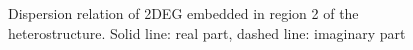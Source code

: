 \documentclass[11pt]{article}
\begin{document}
%
\begin{figure}[tb!]
      \hfil
  \caption{Dispersion relation of 2DEG embedded in region 2 of the heterostructure. Solid line: real part, dashed line: imaginary part}
  \label{fig:simulation1}
\end{figure}
%
\end{document}
